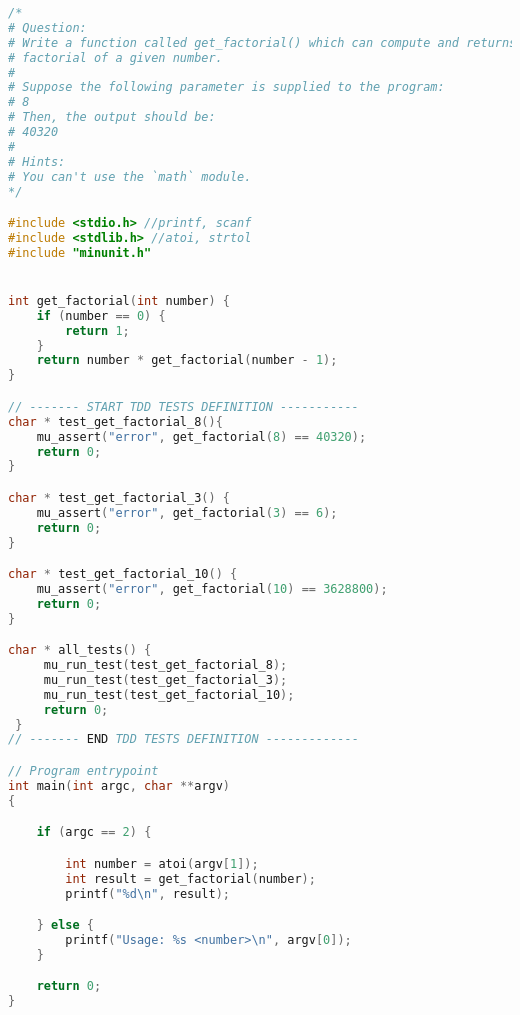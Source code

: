 \begin{lstlisting}[language=c,caption={exercise\_3.c},captionpos=b]
/*
# Question:
# Write a function called get_factorial() which can compute and returns the
# factorial of a given number.
#
# Suppose the following parameter is supplied to the program:
# 8
# Then, the output should be:
# 40320
#
# Hints:
# You can't use the `math` module.
*/

#include <stdio.h> //printf, scanf
#include <stdlib.h> //atoi, strtol
#include "minunit.h"


int get_factorial(int number) {
    if (number == 0) {
        return 1;
    }
    return number * get_factorial(number - 1);
}

// ------- START TDD TESTS DEFINITION -----------
char * test_get_factorial_8(){
    mu_assert("error", get_factorial(8) == 40320);
    return 0;
}

char * test_get_factorial_3() {
    mu_assert("error", get_factorial(3) == 6);
    return 0;
}

char * test_get_factorial_10() {
    mu_assert("error", get_factorial(10) == 3628800);
    return 0;
}

char * all_tests() {
     mu_run_test(test_get_factorial_8);
     mu_run_test(test_get_factorial_3);
     mu_run_test(test_get_factorial_10);
     return 0;
 }
// ------- END TDD TESTS DEFINITION -------------

// Program entrypoint
int main(int argc, char **argv)
{

    if (argc == 2) {

        int number = atoi(argv[1]);
        int result = get_factorial(number);
        printf("%d\n", result);

    } else {
        printf("Usage: %s <number>\n", argv[0]);
    }

    return 0;
}
\end{lstlisting}

